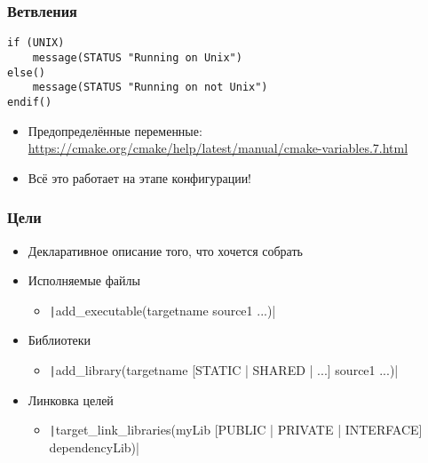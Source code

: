 \documentclass{../../slides-style}
\begin{document}
    \begin{frame}[fragile]
        \frametitle{Ветвления}
        \begin{verbatim}
if (UNIX)
    message(STATUS "Running on Unix")
else()
    message(STATUS "Running on not Unix")
endif()
        \end{verbatim}
        \begin{itemize}
            \item Предопределённые переменные: \url{https://cmake.org/cmake/help/latest/manual/cmake-variables.7.html}
            \item Всё это работает на этапе конфигурации!
        \end{itemize}
    \end{frame}

    \begin{frame}
        \frametitle{Цели}
        \begin{itemize}
            \item Декларативное описание того, что хочется собрать
            \item Исполняемые файлы
            \begin{itemize}
                \item \texttt|add_executable(targetname source1 ...)|
            \end{itemize}
            \item Библиотеки
            \begin{itemize}
                \item \texttt|add_library(targetname [STATIC | SHARED | ...] source1 ...)|
            \end{itemize}
            \item Линковка целей
            \begin{itemize}
                \item \texttt|target_link_libraries(myLib [PUBLIC | PRIVATE | INTERFACE] dependencyLib)|
            \end{itemize}
        \end{itemize}
    \end{frame}
\end{document}
